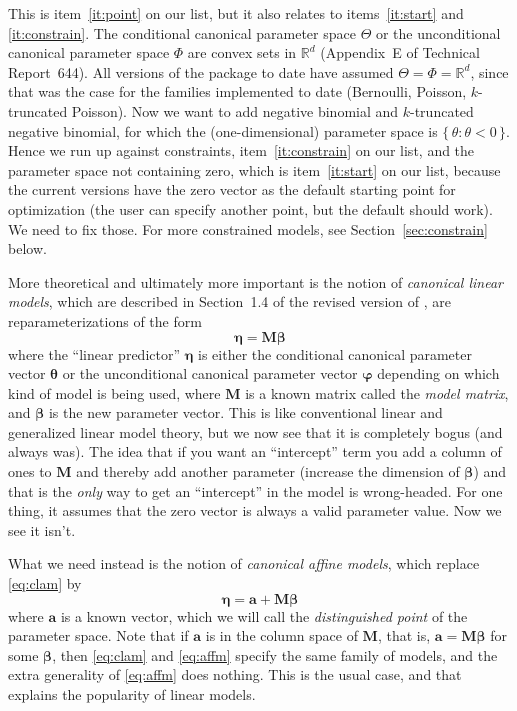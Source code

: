 \documentclass[11pt]{article}
\newcommand{\real}{\mathbb{R}}
\newcommand{\set}[1]{\{\, #1 \,\}}
\newcommand{\boldbeta}{\boldsymbol{\beta}}
\newcommand{\boldeta}{\boldsymbol{\eta}}
\newcommand{\boldtheta}{\boldsymbol{\theta}}
\newcommand{\boldvarphi}{\boldsymbol{\varphi}}
\newcommand{\bolda}{\mathbf{a}}
\newcommand{\boldM}{\mathbf{M}}
\begin{document}
This is item~\ref{it:point} on our list, but it also relates
to items~\ref{it:start} and \ref{it:constrain}.
The conditional canonical parameter space $\Theta$
or the unconditional canonical parameter space $\Phi$ are convex sets in
$\real^d$ (Appendix~E of Technical Report~644).  All versions of the package
to date have assumed $\Theta = \Phi = \real^d$, since that was the case
for the families implemented to date (Bernoulli, Poisson, $k$-truncated
Poisson).  Now we want to add negative binomial and $k$-truncated negative
binomial, for which the (one-dimensional) parameter space
is $\set{ \theta : \theta < 0 }$.  Hence we run up against constraints,
item~\ref{it:constrain} on our list, and the parameter space not containing
zero, which is item~\ref{it:start} on our list, because the current versions
have the zero vector as the default starting point for optimization (the user
can specify another point, but the default should work).  We need to fix those.
For more constrained models, see Section~\ref{sec:constrain} below.

More theoretical and ultimately more important is the notion of
\emph{canonical linear models}, which are described in Section~1.4 of the
revised version of \citet{gws}, are reparameterizations
of the form
\begin{equation} \label{eq:clam}
   \boldeta = \boldM \boldbeta
\end{equation}
where the ``linear predictor'' $\boldeta$ is either the conditional
canonical parameter vector $\boldtheta$ or the unconditional canonical
parameter vector $\boldvarphi$ depending on which kind of model is being
used, where $\boldM$ is a known matrix called the \emph{model matrix},
and $\boldbeta$ is the new parameter vector.
This is like conventional linear and generalized linear model theory, but we
now see that it is completely bogus (and always was).  The idea that
if you want an ``intercept'' term you add a column of ones to $\boldM$
and thereby add another parameter (increase the dimension of $\boldbeta$)
and that is the \emph{only} way to get an ``intercept'' in the model is
wrong-headed.  For one thing, it assumes that the zero vector is always
a valid parameter value.  Now we see it isn't.

What we need instead is the notion of \emph{canonical affine models},
which replace \eqref{eq:clam} by
\begin{equation} \label{eq:affm}
   \boldeta = \bolda + \boldM \boldbeta
\end{equation}
where $\bolda$ is a known vector, which we will call
the \emph{distinguished point} of the parameter space.
Note that if $\bolda$ is in the column space of $\boldM$, that is,
$\bolda = \boldM \boldbeta$ for some $\boldbeta$, then \eqref{eq:clam}
and \eqref{eq:affm} specify the
same family of models, and the extra generality of \eqref{eq:affm} does
nothing.  This is the usual case, and that explains
the popularity of linear models.
\end{document}
